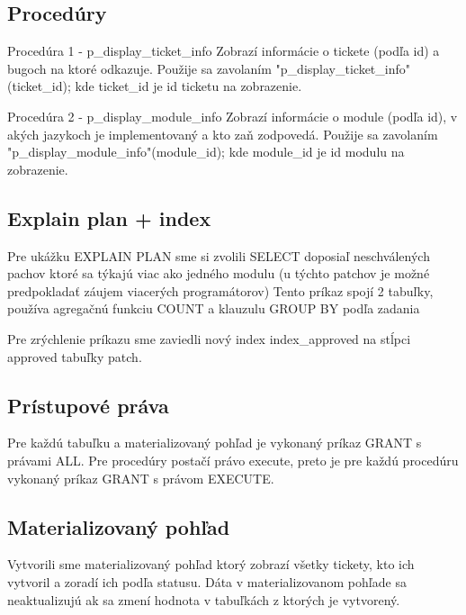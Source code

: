 \documentclass[11pt, a4paper]{article}
\begin{document}
    \subsection{Procedúry}\label{subsec:procedúry}

    Procedúra 1 - p\_display\_ticket\_info
    Zobrazí informácie o tickete (podľa id) a bugoch na ktoré odkazuje.
    Použije sa zavolaním "p\_display\_ticket\_info"(ticket\_id); kde ticket\_id je id ticketu na zobrazenie.

    Procedúra 2 - p\_display\_module\_info
    Zobrazí informácie o module (podľa id), v akých jazykoch je implementovaný a kto zaň zodpovedá.
    Použije sa zavolaním "p\_display\_module\_info"(module\_id); kde module\_id je id modulu na zobrazenie.

    \subsection{Explain plan + index}\label{subsec:explain-plan-+-index}

    Pre ukážku EXPLAIN PLAN sme si zvolili SELECT doposiaľ neschválených pachov ktoré sa týkajú viac ako jedného modulu (u týchto patchov je možné predpokladať záujem viacerých programátorov)
    Tento príkaz spojí 2 tabuľky, používa agregačnú funkciu COUNT a klauzulu GROUP BY podľa zadania

    Pre zrýchlenie príkazu sme zaviedli nový index index\_approved na stĺpci approved tabuľky patch.

    \subsection{Prístupové práva}\label{subsec:prístupové-práva}

    Pre každú tabuľku a materializovaný pohľad je vykonaný príkaz GRANT s právami ALL.
    Pre procedúry postačí právo execute, preto je pre každú procedúru vykonaný príkaz GRANT s právom EXECUTE.

    \subsection{Materializovaný pohľad}\label{subsec:materializovaný-pohľad}

    Vytvorili sme materializovaný pohľad ktorý zobrazí všetky tickety, kto ich vytvoril a zoradí ich podľa statusu.
    Dáta v materializovanom pohľade sa neaktualizujú ak sa zmení hodnota v tabuľkách z ktorých je vytvorený.
\end{document}
